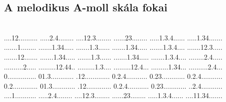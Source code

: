  
 
\pagestyle{empty}

\vspace*{\fill}
\subsection*{A melodikus A-moll skála fokai}~\\
          {....12..........%
           .....2.4........%
           ....12.3........%
           ......23........%
           .....1.3.4......%
           .....1.34.......}
          {.......1........%
           .......1.34.....%
           .......1.3......%
           .......1.34.....%
           .......1.3.4....%
           .......12.3.....}
          {.......12.......%
           .......1.34.....%
           .......1.3......%
           .......1.34.....%
           .......1.3.4....%
           ........2.4.....}
          {..........2.....%
           .........12.44..%
           .........1.3....%
           .........12.4...%
           .........1.34...%
           ..........2.4...}
          {0...............%
           01.3............%
           .12.............%
           0.2.4...........%
           0.23............%
           0.2.4...........}
          {0.2.............%
           01.3............%
           .12.............%
           0.2.4...........%
           0.23............%
           ..2.4...........}
          {....1...........%
           .....2.4........%
           ....12.3........%
           ......23........%
           .....1.3.4......%
           ....11.34.......}
\vspace*{\fill}

